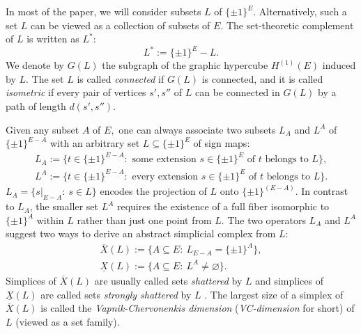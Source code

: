 \documentclass[11pt,a4paper]{amsart}
\theoremstyle{definition}
\numberwithin{equation}{section}
\newcommand{\covectors}{\ensuremath{L}}
\newcommand{\X}{\ensuremath{X}}
\newcommand{\HH}{\ensuremath{H}}
\begin{document}
In most  of the paper, we will consider subsets ${\covectors}$ of $\{ \pm 1\}^E$. Alternatively, such a set $\covectors$ can be viewed as a collection of subsets of $E$.  The set-theoretic complement of $\covectors$ is written as
${\covectors}^*:$
$${\covectors}^*:=\{ \pm 1\}^E-{\covectors}.$$
We denote by $G({\covectors})$ %
the subgraph of the graphic hypercube ${\HH}^{(1)}(E)$ induced by  $\covectors$. The set $\covectors$ is
called {\it connected}
if $G({\covectors})$ is connected, and it is called {\it isometric} if every
pair of vertices $s',s''$ of $\covectors$ can be connected in $G({\covectors})$
by a path of length $d(s',s'').$

Given any subset $A$ of $E,$ one can always associate two subsets
${\covectors}_A$ and ${\covectors}^A$ of $\{ \pm 1\}^{E-A}$ with an arbitrary set
${\covectors}\subseteq \{ \pm 1\}^{E}$ of sign maps:
\begin{align*}
{\covectors}_A:= \{ t\in \{ \pm 1\}^{E-A}: \mbox{ some extension } s\in \{ \pm 1\}^E \mbox{ of } t
\mbox{ belongs to } {\covectors} \},\\
{\covectors}^A:= \{ t\in \{ \pm 1\}^{E-A}: \mbox{ every extension } s\in \{ \pm 1\}^E \mbox{ of } t
\mbox{ belongs to } {\covectors} \}.
\end{align*}
${\covectors}_A=\{ s|_{E-A}: ~s\in {\covectors}\}$ encodes the projection of $\covectors$ onto $\{\pm 1\}^{({E-A})}.$
In contrast to ${\covectors}_A$, the smaller set ${\covectors}^A$ requires the existence of a full fiber
isomorphic to $\{\pm 1\}^{A}$  within $\covectors$ rather than just one point from $\covectors$.
The two operators ${\covectors}_A$ and ${\covectors}^A$ suggest two ways
to derive an abstract simplicial complex from $\covectors$:
\begin{align*}
\overline{\X}({\covectors}):=\{ A\subseteq E: ~{\covectors}_{E-A}=\{ \pm 1\}^A\},\\
\underline{{\X}}({\covectors}):=\{ A\subseteq E: ~{\covectors}^A\ne \varnothing\}.~~~~~~~~~~~
\end{align*}
Simplices of $\overline{{\X}}({\covectors})$ are  usually called  sets \emph{shattered} by $\covectors$  and  simplices of $\underline{{\X}}({\covectors})$ are called sets \emph{strongly shattered} by $\covectors$ \cite{ChChMoWa,MoWa}. The largest size of a simplex of $\overline{{\X}}({\covectors})$ is called the
\emph{Vapnik-Chervonenkis dimension} (\emph{VC-dimension} for short) of $\covectors$ (viewed as a set family). %
\end{document}
